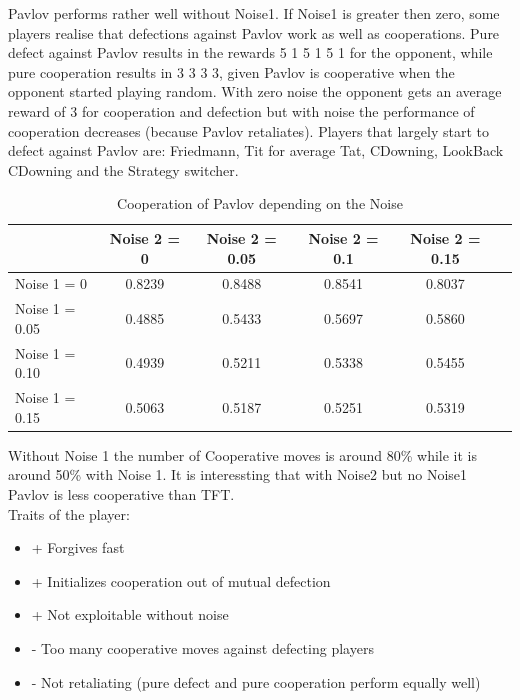 Pavlov performs rather well without Noise1. If Noise1 is greater then zero, some players realise that defections against Pavlov work as well as cooperations. Pure defect against Pavlov results in the rewards 5 1 5 1 5 1 for the opponent, while pure cooperation results in 3 3 3 3, given Pavlov is cooperative when the opponent started playing random. With zero noise the opponent gets an average reward of 3 for cooperation and defection but with noise the performance of cooperation decreases (because Pavlov retaliates). Players that largely start to defect against Pavlov are:  Friedmann, Tit for average Tat, CDowning, LookBack CDowning and the Strategy switcher.

\begin{table}[h]
 \begin{center}
\caption{Cooperation of Pavlov depending on the Noise} \vspace{3mm}
\begin{tabular}{|l|c|c|c|c|c|}
\hline
   	& Noise 2 = 0 & Noise 2 = 0.05& Noise 2 = 0.1& Noise 2 = 0.15 \\
  \hline
  Noise 1 = 0 	&     0.8239 &   0.8488&    0.8541&    0.8037 \\
 \hline
  Noise 1 = 0.05	 &   0.4885  &  0.5433 &   0.5697  &  0.5860 \\
 \hline
  Noise 1 = 0.10 	& 0.4939  &  0.5211 &   0.5338 &   0.5455 \\
 \hline
  Noise 1 = 0.15 	& 0.5063    &0.5187  &  0.5251 &   0.5319 \\
 \hline
\end{tabular}
 \end{center}
\end{table}

Without Noise 1 the number of Cooperative moves is around 80\% while it is around 50\% with Noise 1. It is interessting that with Noise2 but no Noise1 Pavlov is less cooperative than TFT.\\


Traits of the player:

\renewcommand{\labelitemi}{}
\begin{itemize}
	\item + Forgives fast
	\item + Initializes cooperation out of mutual defection
	\item + Not exploitable without noise
	\item - Too many cooperative moves against defecting players
	\item - Not retaliating (pure defect and pure cooperation perform equally well)
\end{itemize}
\renewcommand{\labelitemi}{$\bullet$}

